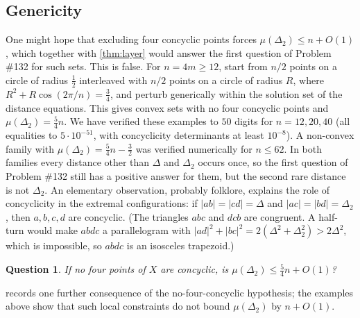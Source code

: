 \documentclass[11pt]{amsart}
\newtheorem{question}[theorem]{Question}
\theoremstyle{definition}
\theoremstyle{remark}
\newcommand{\Dt}{\Delta_2}
\newcommand{\mult}{\mu}
\begin{document}
\subsection*{Genericity}
One might hope that excluding four concyclic points forces $\mult(\Dt)\le n+O(1)$, which together with \cref{thm:layer} would answer the first question of Problem \#132 for such sets. This is false. For $n=4m\ge12$, start from $n/2$ points on a circle of radius $\frac12$ interleaved with $n/2$ points on a circle of radius $R$, where $R^2+R\cos(2\pi/n)=\frac34$, and perturb generically within the solution set of the distance equations. This gives convex sets with no four concyclic points and $\mult(\Dt)=\frac54n$. We have verified these examples to $50$ digits for $n=12,20,40$ (all equalities to $5\cdot10^{-51}$, with concyclicity determinants at least $10^{-8}$). A non-convex family with $\mult(\Dt)=\frac54n-\frac32$ was verified numerically for $n\le62$. In both families every distance other than $\Delta$ and $\Dt$ occurs once, so the first question of Problem \#132 still has a positive answer for them, but the second rare distance is not $\Dt$. An elementary observation, probably folklore, explains the role of concyclicity in the extremal configurations: if $|ab|=|cd|=\Delta$ and $|ac|=|bd|=\Dt$, then $a,b,c,d$ are concyclic. (The triangles $abc$ and $dcb$ are congruent. A half-turn would make $abdc$ a parallelogram with $|ad|^2+|bc|^2=2(\Delta^2+\Dt^2)>2\Delta^2$, which is impossible, so $abdc$ is an isosceles trapezoid.)
\begin{question}\label{q:genericity}
If no four points of $X$ are concyclic, is $\mult(\Dt)\le\frac54n+O(1)$?
\end{question}
 records one further consequence of the no-four-concyclic hypothesis; the examples above show that such local constraints do not bound $\mult(\Dt)$ by $n+O(1)$.
\end{document}

